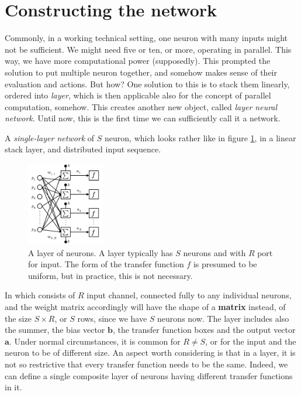 \section{Constructing the network}

Commonly, in a working technical setting, one neuron with many inputs might not be sufficient. We might need five or ten, or more, operating in parallel. This way, we have more computational power (supposedly). This prompted the solution to put multiple neuron together, and somehow makes sense of their evaluation and actions. But how? One solution to this is to stack them linearly, ordered into \textit{layer}, which is then applicable also for the concept of parallel computation, somehow. This creates another new object, called \textit{layer neural network}. Until now, this is the first time we can sufficiently call it a network. 

A \textit{single-layer network} of $S$ neuron, which looks rather like in figure \ref{fig:lulululala}, in a linear stack layer, and distributed input sequence. 
\begin{figure}[h!]
    \centering
    \includegraphics[width=0.3\textwidth]{img/aaeSFF.png}
    \caption{A layer of neurons. A layer typically has $S$ neurons and with $R$ port for input. The form of the transfer function $f$ is presumed to be uniform, but in practice, this is not necessary.}
    \label{fig:lulululala}
\end{figure}

In which consists of $R$ input channel, connected fully to any individual neurons, and the weight matrix accordingly will have the shape of a \textbf{matrix} instead, of the size $S\times R$, or $S$ rows, since we have $S$ neurons now. The layer includes also the summer, the bias vector $\mathbf{b}$, the transfer function boxes and the output vector $\mathbf{a}$. Under normal circumstances, it is common for $R\neq S$, or for the input and the neuron to be of different size. An aspect worth considering is that in a layer, it is not so restrictive that every transfer function needs to be the same. Indeed, we can define a single composite layer of neurons having different transfer functions in it. 

